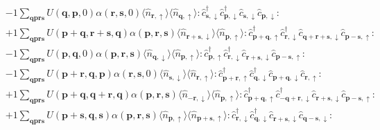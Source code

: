 \begin{align*}
	&-1 \sum_{ \mathbf{q} \mathbf{p} \mathbf{r} \mathbf{s} } U( \mathbf{q}, \mathbf{p}, 0 )  \alpha( \mathbf{r}, \mathbf{s}, 0 )   \langle \hat{n}_{ \mathbf{r}, \uparrow } \rangle \langle \hat{n}_{ \mathbf{q}, \uparrow } \rangle :\hat{c}_{ \mathbf{s}, \downarrow }^\dagger \hat{c}_{ \mathbf{p}, \downarrow }^\dagger \hat{c}_{ \mathbf{s}, \downarrow }^{\phantom{\dagger}}\hat{c}_{ \mathbf{p}, \downarrow }^{\phantom{\dagger}}: \\
	&+1 \sum_{ \mathbf{q} \mathbf{p} \mathbf{r} \mathbf{s} } U( \mathbf{p}+\mathbf{q}, \mathbf{r}+\mathbf{s}, \mathbf{q} )  \alpha( \mathbf{p}, \mathbf{r}, \mathbf{s} )   \langle \hat{n}_{ \mathbf{r}+\mathbf{s}, \downarrow } \rangle \langle \hat{n}_{ \mathbf{p}, \uparrow } \rangle :\hat{c}_{ \mathbf{p}+\mathbf{q}, \uparrow }^\dagger \hat{c}_{ \mathbf{r}, \downarrow }^\dagger \hat{c}_{ \mathbf{q}+\mathbf{r}+\mathbf{s}, \downarrow }^{\phantom{\dagger}}\hat{c}_{ \mathbf{p}-\mathbf{s}, \uparrow }^{\phantom{\dagger}}: \\
	&-1 \sum_{ \mathbf{q} \mathbf{p} \mathbf{r} \mathbf{s} } U( \mathbf{p}, \mathbf{q}, 0 )  \alpha( \mathbf{p}, \mathbf{r}, \mathbf{s} )   \langle \hat{n}_{ \mathbf{q}, \downarrow } \rangle \langle \hat{n}_{ \mathbf{p}, \uparrow } \rangle :\hat{c}_{ \mathbf{p}, \uparrow }^\dagger \hat{c}_{ \mathbf{r}, \downarrow }^\dagger \hat{c}_{ \mathbf{r}+\mathbf{s}, \downarrow }^{\phantom{\dagger}}\hat{c}_{ \mathbf{p}-\mathbf{s}, \uparrow }^{\phantom{\dagger}}: \\
	&-1 \sum_{ \mathbf{q} \mathbf{p} \mathbf{r} \mathbf{s} } U( \mathbf{p}+\mathbf{r}, \mathbf{q}, \mathbf{p} )  \alpha( \mathbf{r}, \mathbf{s}, 0 )   \langle \hat{n}_{ \mathbf{s}, \downarrow } \rangle \langle \hat{n}_{ \mathbf{r}, \uparrow } \rangle :\hat{c}_{ \mathbf{p}+\mathbf{r}, \uparrow }^\dagger \hat{c}_{ \mathbf{q}, \downarrow }^\dagger \hat{c}_{ \mathbf{p}+\mathbf{q}, \downarrow }^{\phantom{\dagger}}\hat{c}_{ \mathbf{r}, \uparrow }^{\phantom{\dagger}}: \\
	&+1 \sum_{ \mathbf{q} \mathbf{p} \mathbf{r} \mathbf{s} } U( \mathbf{p}+\mathbf{q}, \mathbf{q}+\mathbf{r}, \mathbf{q} )  \alpha( \mathbf{p}, \mathbf{r}, \mathbf{s} )   \langle \hat{n}_{ -\mathbf{r}, \downarrow } \rangle \langle \hat{n}_{ \mathbf{p}, \uparrow } \rangle :\hat{c}_{ \mathbf{p}+\mathbf{q}, \uparrow }^\dagger \hat{c}_{ -\mathbf{q}+\mathbf{r}, \downarrow }^\dagger \hat{c}_{ \mathbf{r}+\mathbf{s}, \downarrow }^{\phantom{\dagger}}\hat{c}_{ \mathbf{p}-\mathbf{s}, \uparrow }^{\phantom{\dagger}}: \\
	&+1 \sum_{ \mathbf{q} \mathbf{p} \mathbf{r} \mathbf{s} } U( \mathbf{p}+\mathbf{s}, \mathbf{q}, \mathbf{s} )  \alpha( \mathbf{p}, \mathbf{r}, \mathbf{s} )   \langle \hat{n}_{ \mathbf{p}, \uparrow } \rangle \langle \hat{n}_{ \mathbf{p}+\mathbf{s}, \uparrow } \rangle :\hat{c}_{ \mathbf{r}, \downarrow }^\dagger \hat{c}_{ \mathbf{q}, \downarrow }^\dagger \hat{c}_{ \mathbf{r}+\mathbf{s}, \downarrow }^{\phantom{\dagger}}\hat{c}_{ \mathbf{q}-\mathbf{s}, \downarrow }^{\phantom{\dagger}}: \\

\end{align*}
